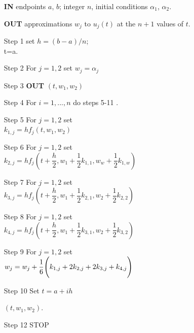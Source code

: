 \documentclass[12pt,twoside]{extarticle}
\begin{document}
\begin{itemize}
    \item[{\bf IN}] endpoints $a$, $b$; integer $n$, initial conditions $\alpha_1$, $\alpha_2$.
    
    \item[ {\bf OUT}] approximations $w_j$ to $u_j(t)$ at the $n+1$ values of $t$. 
    \item[Step 1]
    set $h=(b-a)/n$; \\
    \indent\hspace{0.4cm} t=a.
    
    \item [Step 2]
    For $j=1, 2$ set $w_j=\alpha_j$
    
    \item[Step 3]
    \textbf{OUT} $(t, w_1, w_2)$
    
    \item[Step 4]
    For $i=1,...,n$ do steps 5-11 .
    
        \subitem Step 5 For $j=1, 2$ set \\
        \indent\hspace{2.3cm} $k_{1,j}=hf_j(t,w_1,w_2)$
        
        \subitem Step 6 For $j = 1, 2$ set \\
        \indent\hspace{2.3cm} $k_{2,j}=hf_j \left(t+\dfrac{h}{2},w_1+\dfrac{1}{2}k_{1,1}, w_w+\dfrac{1}{2}k_{1,w}\right)$
        
        \subitem Step 7 For $j = 1, 2$ set \\
        \indent\hspace{2.3cm} $k_{3,j}=hf_j \left(t+\dfrac{h}{2},w_1+\dfrac{1}{2}k_{2,1}, w_2 +\dfrac{1}{2}k_{2,2}\right)$
        
        \subitem Step 8 For $j = 1, 2$ set \\
        \indent\hspace{2.3cm} $k_{4,j}=hf_j \left(t+\dfrac{h}{2},w_1+\dfrac{1}{2}k_{3,1}, w_2+\dfrac{1}{2}k_{3,2}\right)$
        
        \subitem Step 9 For $j = 1, 2$ set \\
        \indent\hspace{2.3cm} $w_j = w_j + \dfrac{1}{6}\qty\Bigg(k_{1,j} + 2k_{2,j} + 2k_{3,j} + k_{4,j})$
        
        \subitem Step 10 Set $t=a + ih$
        
         $(t, w_1, w_2)$.
    
    \item[Step 12] STOP
\end{itemize}
\end{document}
